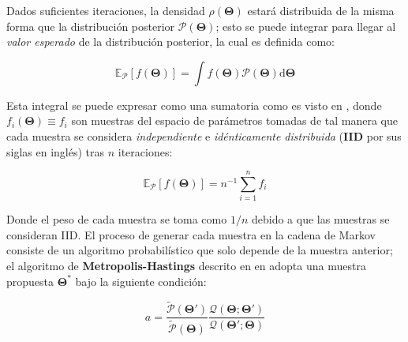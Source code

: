 Dados suficientes iteraciones, la densidad $\rho(\mathbf{\Theta})$ estará
distribuida de la misma forma que la distribución posterior
$\mathcal{P}(\mathbf{\Theta})$; esto se puede integrar para llegar al
\textit{valor esperado} de la distribución posterior, la cual es definida como:

\begin{eqfloat}[!ht]
	\centering
	\begin{equation}
		\mathbb{E}_{\mathcal{P}}\left[f(\mathbf{\Theta})\right] = \int{f(\mathbf{\Theta}) \mathcal{P}(\mathbf{\Theta}) \textrm{d}\mathbf{\Theta}}
	\end{equation}
\end{eqfloat}

Esta integral se puede expresar como una sumatoria como es visto en , donde $f_i(\mathbf{\Theta})
\equiv f_i$ son muestras del espacio de parámetros tomadas de tal manera que
cada muestra se considera \textit{independiente} e \textit{idénticamente
distribuida} (\textbf{IID} por sus siglas en inglés) tras $n$ iteraciones:

\begin{eqfloat}[!ht]
	\centering
	\begin{equation}
		\mathbb{E}_{\mathcal{P}}\left[f(\mathbf{\Theta})\right] = n^{-1} \sum_{i=1}^{n}{f_i}
	\end{equation}
\end{eqfloat}

\newpage

Donde el peso de cada muestra se toma como $1/n$ debido a que las muestras se
consideran IID. El proceso de generar cada muestra en la cadena de Markov
consiste de un algoritmo probabilístico que solo depende de la muestra anterior;
el algoritmo de \textbf{Metropolis-Hastings} descrito en en
adopta una muestra propuesta $\mathbf{\Theta}^*$ bajo la siguiente condición:

\begin{eqfloat}[!ht]
	\centering
	\begin{equation}
		a = \frac{\tilde{\mathcal{P}}(\mathbf{\Theta}')}{\tilde{\mathcal{P}}(\mathbf{\Theta})} \frac{\mathcal{Q}(\mathbf{\Theta} ; \mathbf{\Theta}')}{\mathcal{Q}(\mathbf{\Theta}' ; \mathbf{\Theta})}
	\end{equation}
\end{eqfloat}


